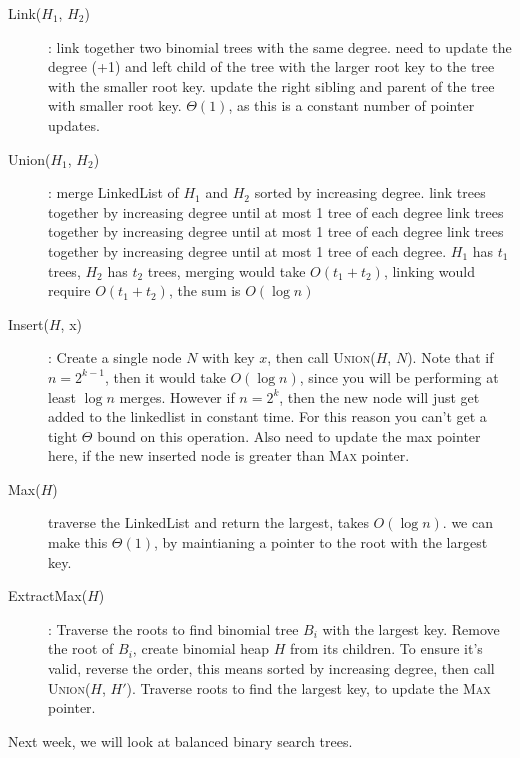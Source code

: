 \begin{description}
    \item[Link($H_1$, $H_2$)]: link together two binomial trees with the same degree. need to update the degree (+1) and left child of the tree with the larger root key to the tree with the smaller root key. update the right sibling and parent of the tree with smaller root key. $\Theta(1)$, as this is a constant number of pointer updates.
    \item[Union($H_1$, $H_2$)]: merge LinkedList of $H_1$ and $H_2$ sorted by increasing degree. link trees together by increasing degree until at most 1 tree of each degree link trees together by increasing degree until at most 1 tree of each degree link trees together by increasing degree until at most 1 tree of each degree. $H_1$ has $t_1$ trees, $H_2$ has $t_2$ trees, merging would take $O(t_1 + t_2)$, linking would require $O(t_1 + t_2)$, the sum is $O(\log n)$
    \item[Insert($H$, x)]: Create a single node $N$ with key $x$, then call \textsc{Union}($H$, $N$). Note that if $n = 2^{k-1}$, then it would take $O(\log n)$, since you will be performing at least $\log n$ merges. However if $n = 2^k$, then the new node will just get added to the linkedlist in constant time. For this reason you can't get a tight $\Theta$ bound on this operation. Also need to update the max pointer here, if the new inserted node is greater than \textsc{Max} pointer.
    \item[Max($H$)] traverse the LinkedList and return the largest, takes $O(\log n)$. we can make this $\Theta(1)$, by maintianing a pointer to the root with the largest key. 
    \item[ExtractMax($H$)]: Traverse the roots to find binomial tree $B_i$ with the largest key. Remove the root of $B_i$, create binomial heap $H$ from its children. To ensure it's valid, reverse the order, this means sorted by increasing degree, then call \textsc{Union}($H$, $H'$). Traverse roots to find the largest key, to update the \textsc{Max} pointer.
\end{description}

\noindent Next week, we will look at balanced binary search trees.
